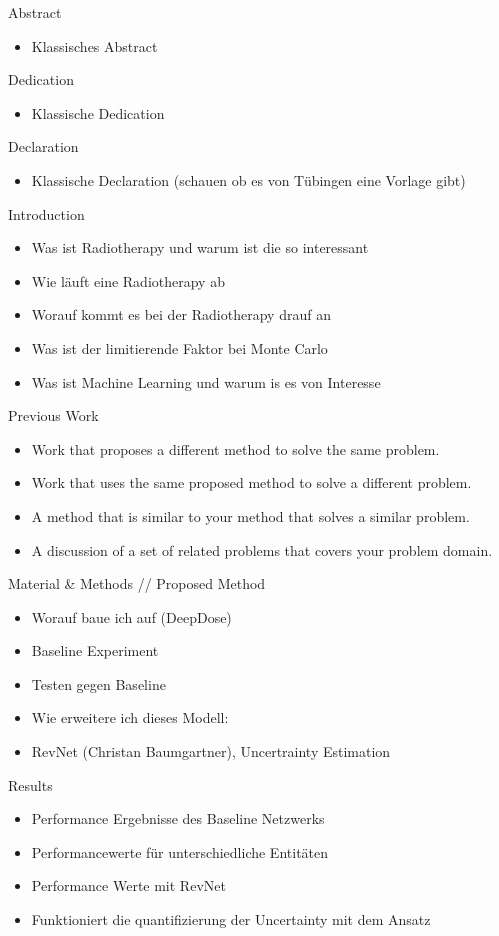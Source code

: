 Abstract
\begin{itemize}[noitemsep]
    \item Klassisches Abstract
\end{itemize}

\noindent
Dedication
\begin{itemize}[noitemsep]
    \item Klassische Dedication
\end{itemize}

\noindent
Declaration
\begin{itemize}[noitemsep]
    \item Klassische Declaration (schauen ob es von Tübingen eine Vorlage gibt)
\end{itemize}
\noindent
Introduction
\begin{itemize}[noitemsep]
    \item Was ist Radiotherapy und warum ist die so interessant
    \item Wie läuft eine Radiotherapy ab
    \item Worauf kommt es bei der Radiotherapy drauf an
    \item Was ist der limitierende Faktor bei Monte Carlo
    \item Was ist Machine Learning und warum is es von Interesse
\end{itemize}
\noindent
Previous Work
\begin{itemize}[noitemsep]
    \item Work that proposes a different method to solve the same problem.
    \item Work that uses the same proposed method to solve a different problem.
    \item A method that is similar to your method that solves a similar problem.
    \item A discussion of a set of related problems that covers your problem domain.
\end{itemize}
\noindent
Material \& Methods // Proposed Method
\begin{itemize}[noitemsep]
    \item Worauf baue ich auf (DeepDose)
    \item Baseline Experiment
    \item Testen gegen Baseline
    \item Wie erweitere ich dieses Modell:
    \item RevNet (Christan Baumgartner), Uncertrainty Estimation
\end{itemize}
\noindent
Results
\begin{itemize}[noitemsep]
    \item Performance Ergebnisse des Baseline Netzwerks
    \item Performancewerte für unterschiedliche Entitäten
    \item Performance Werte mit RevNet
    \item Funktioniert die quantifizierung der Uncertainty mit dem Ansatz
\end{itemize}

